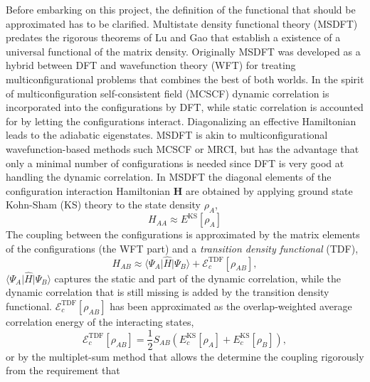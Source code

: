 \documentclass[journal=jacsat,manuscript=article]{achemso}
\newcommand\m[1]{\mathbf{#1}}
\begin{document}
Before embarking on this project,
the definition of the functional that should be approximated has to be clarified. Multistate density functional theory (MSDFT)
\cite{Gao2016} predates the rigorous theorems of Lu and Gao \cite{Lu2022JPCL}
that establish a existence of a universal functional of the matrix density.
Originally MSDFT was developed as a hybrid between DFT and wavefunction theory (WFT) for treating multiconfigurational problems
that combines the best of both worlds. In the spirit of multiconfiguration self-consistent field (MCSCF) dynamic correlation is incorporated
into the configurations by DFT, while static correlation is accounted for by letting the configurations interact.
Diagonalizing an effective Hamiltonian leads to the adiabatic eigenstates. MSDFT is akin to multiconfigurational wavefunction-based methods such
MCSCF or MRCI, but has the advantage that only a minimal number of configurations is needed \cite{Lu2022fundamental} since DFT
is very good at handling the dynamic correlation. \cite{Leininger1997combining}
In MSDFT\cite{Gao2016} the diagonal elements
of the configuration interaction Hamiltonian $\m{H}$ are obtained by applying ground state Kohn-Sham (KS) theory to the state density $\rho_A$,
\cite[Eqn.~(3)]{Grofe2017} \cite[Eqn.~(12)]{Zhu2023}
\begin{equation}
 H_{AA} \approx E^{\text{KS}}[\rho_A]
\end{equation}
The coupling between the configurations is approximated by the matrix elements of the configurations (the WFT part)
and a \emph{transition density functional} (TDF), \cite[Eqn.~(5)]{Grofe2017}
\begin{equation}
 H_{AB} \approx \langle \Psi_A \vert \hat{H} \vert \Psi_B \rangle + \mathcal{E}^{\text{TDF}}_c[\rho_{AB}],
\end{equation}
$\langle \Psi_A \vert \hat{H} \vert \Psi_B \rangle$ captures the static and part of the dynamic correlation,
while the dynamic correlation that is still missing is added by the transition density functional.
$\mathcal{E}^{\text{TDF}}_c[\rho_{AB}]$ has been
approximated as the overlap-weighted average correlation energy of the interacting states, \cite[Eqn.~(6)]{Gao2016}
\begin{equation}
  \mathcal{E}^{\text{TDF}}_c[\rho_{AB}] = \frac{1}{2} S_{AB} \left( E_c^{\text{KS}}[\rho_A] + E_c^{\text{KS}}[\rho_B] \right),
\end{equation}
or by the multiplet-sum method \cite{Ziegler1977,Grofe2017} that allows the determine the coupling rigorously from the requirement that
\end{document}
